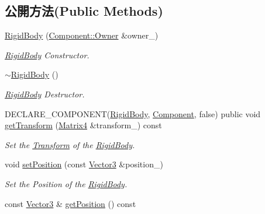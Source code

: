 \subsection*{公開方法(Public Methods)}
\begin{DoxyCompactItemize}
\item 
\hyperlink{class_magnum_1_1_physics3_1_1_rigid_body_a2327744d90c049296ea0d63b3e64d335}{Rigid\+Body} (\hyperlink{class_magnum_1_1_component_1_1_owner}{Component\+::\+Owner} \&owner\+\_\+)
\begin{DoxyCompactList}\small\item\em \hyperlink{class_magnum_1_1_physics3_1_1_rigid_body}{Rigid\+Body} Constructor. \end{DoxyCompactList}\item 
\hyperlink{class_magnum_1_1_physics3_1_1_rigid_body_ac335c0a007b0afc2a2d346330906fe20}{$\sim$\+Rigid\+Body} ()
\begin{DoxyCompactList}\small\item\em \hyperlink{class_magnum_1_1_physics3_1_1_rigid_body}{Rigid\+Body} Destructor. \end{DoxyCompactList}\item 
D\+E\+C\+L\+A\+R\+E\+\_\+\+C\+O\+M\+P\+O\+N\+E\+NT(\hyperlink{class_magnum_1_1_physics3_1_1_rigid_body}{Rigid\+Body}, \hyperlink{class_magnum_1_1_component}{Component}, false) public void \hyperlink{class_magnum_1_1_physics3_1_1_rigid_body_af2e7f7ab84a226d14baa80afe0b7bec2}{get\+Transform} (\hyperlink{class_magnum_1_1_matrix4}{Matrix4} \&transform\+\_\+) const 
\begin{DoxyCompactList}\small\item\em Set the \hyperlink{class_magnum_1_1_transform}{Transform} of the \hyperlink{class_magnum_1_1_physics3_1_1_rigid_body}{Rigid\+Body}. \end{DoxyCompactList}\item 
void \hyperlink{class_magnum_1_1_physics3_1_1_rigid_body_af66b61c406dbf2a42d8481806bed5e9c}{set\+Position} (const \hyperlink{class_magnum_1_1_vector3}{Vector3} \&position\+\_\+)
\begin{DoxyCompactList}\small\item\em Set the Position of the \hyperlink{class_magnum_1_1_physics3_1_1_rigid_body}{Rigid\+Body}. \end{DoxyCompactList}\item 
const \hyperlink{class_magnum_1_1_vector3}{Vector3} \& \hyperlink{class_magnum_1_1_physics3_1_1_rigid_body_a39de26b1ca7c1666c0b8070708d16a50}{get\+Position} () const 

\end{DoxyCompactItemize}
